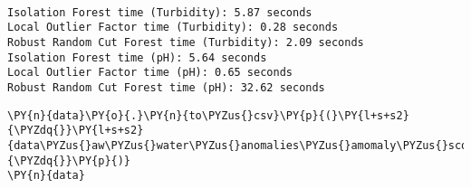     \begin{center}
    \end{center}
    { \hspace*{\fill} \\}
    
    \begin{Verbatim}[commandchars=\\\{\}]
Isolation Forest time (Turbidity): 5.87 seconds
Local Outlier Factor time (Turbidity): 0.28 seconds
Robust Random Cut Forest time (Turbidity): 2.09 seconds
Isolation Forest time (pH): 5.64 seconds
Local Outlier Factor time (pH): 0.65 seconds
Robust Random Cut Forest time (pH): 32.62 seconds
    \end{Verbatim}

    \begin{tcolorbox}[breakable, size=fbox, boxrule=1pt, pad at break*=1mm,colback=cellbackground, colframe=cellborder]
\begin{Verbatim}[commandchars=\\\{\}]
\PY{n}{data}\PY{o}{.}\PY{n}{to\PYZus{}csv}\PY{p}{(}\PY{l+s+s2}{\PYZdq{}}\PY{l+s+s2}{data\PYZus{}aw\PYZus{}water\PYZus{}anomalies\PYZus{}amomaly\PYZus{}scores.csv}\PY{l+s+s2}{\PYZdq{}}\PY{p}{)}
\PY{n}{data}
\end{Verbatim}
\end{tcolorbox}


